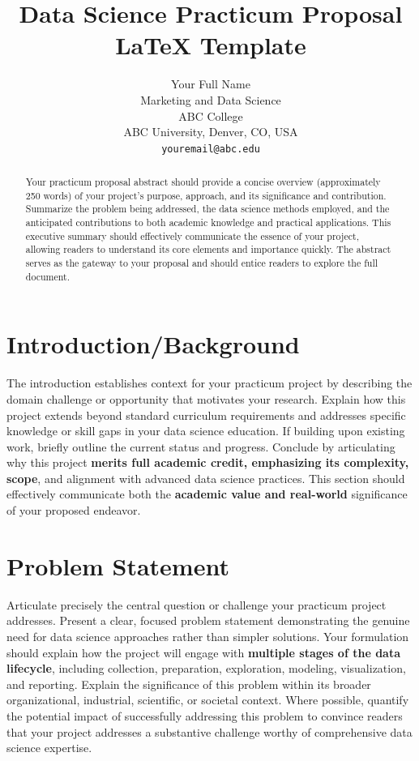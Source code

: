 \documentclass[12pt, onecolumn]{IEEEtran}
\begin{document}
\title{Data Science Practicum Proposal LaTeX Template}

\author{Your Full Name \\
Marketing and Data Science \\
ABC College \\
ABC University, Denver, CO, USA \\
\texttt{youremail@abc.edu}}


\maketitle


\begin{abstract}
Your practicum proposal abstract should provide a concise overview (approximately 250 words) of your project's purpose, approach, and its significance and contribution. Summarize the problem being addressed, the data science methods employed, and the anticipated contributions to both academic knowledge and practical applications. This executive summary should effectively communicate the essence of your project, allowing readers to understand its core elements and importance quickly. The abstract serves as the gateway to your proposal and should entice readers to explore the full document.
\end{abstract}


\section{Introduction/Background}
The introduction establishes context for your practicum project by describing the domain challenge or opportunity that motivates your research. Explain how this project extends beyond standard curriculum requirements and addresses specific knowledge or skill gaps in your data science education. If building upon existing work, briefly outline the current status and progress. Conclude by articulating why this project \textbf{merits full academic credit, emphasizing its complexity, scope}, and alignment with advanced data science practices. This section should effectively communicate both the \textbf{academic value and real-world }significance of your proposed endeavor.



\section{Problem Statement}
Articulate precisely the central question or challenge your practicum project addresses. Present a clear, focused problem statement demonstrating the genuine need for data science approaches rather than simpler solutions. Your formulation should explain how the project will engage with \textbf{multiple stages of the data lifecycle}, including collection, preparation, exploration, modeling, visualization, and reporting. Explain the significance of this problem within its broader organizational, industrial, scientific, or societal context. Where possible, quantify the potential impact of successfully addressing this problem to convince readers that your project addresses a substantive challenge worthy of comprehensive data science expertise.
\end{document}
